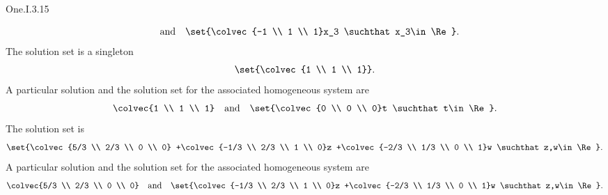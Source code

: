 \begin{ans}{One.I.3.15}
\begin{exparts}
\begin{equation*}
              \quad\text{and}\quad
            \set{\colvec{-1 \\ 1 \\ 1}x_3
              \suchthat x_3\in\Re}.
          \end{equation*}
        \partsitem
          The solution set is a singleton
          \begin{equation*}
            \set{\colvec{1 \\ 1 \\ 1}}.
          \end{equation*}
          A particular solution and the solution set for the associated
          homogeneous system are
          \begin{equation*}
            \colvec{1 \\ 1 \\ 1}
              \quad\text{and}\quad
            \set{\colvec{0 \\ 0 \\ 0}t
              \suchthat t\in\Re}.
          \end{equation*}
        \partsitem
          The solution set is
          \begin{equation*}
            \set{\colvec{5/3 \\ 2/3 \\ 0 \\ 0}
                 +\colvec{-1/3 \\ 2/3 \\ 1 \\ 0}z
                 +\colvec{-2/3 \\ 1/3 \\ 0 \\ 1}w
                 \suchthat z,w\in\Re}.
          \end{equation*}
          A particular solution and the solution set for the associated
          homogeneous system are
          \begin{equation*}
            \colvec{5/3 \\ 2/3 \\ 0 \\ 0}
              \quad\text{and}\quad
            \set{\colvec{-1/3 \\ 2/3 \\ 1 \\ 0}z
                 +\colvec{-2/3 \\ 1/3 \\ 0 \\ 1}w
                 \suchthat z,w\in\Re}.
          \end{equation*}

\end{exparts}
\end{ans}
